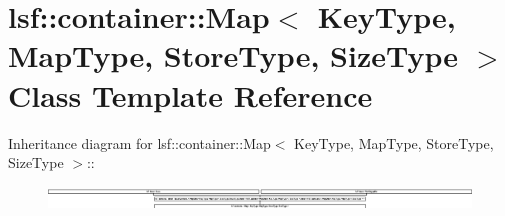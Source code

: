 \hypertarget{classlsf_1_1container_1_1Map}{
\section{lsf::container::Map$<$ KeyType, MapType, StoreType, SizeType $>$ Class Template Reference}
\label{classlsf_1_1container_1_1Map}
}
Inheritance diagram for lsf::container::Map$<$ KeyType, MapType, StoreType, SizeType $>$::\begin{figure}[H]
\begin{center}
\leavevmode
\includegraphics[height=0.624535cm]{classlsf_1_1container_1_1Map}
\end{center}
\end{figure}
